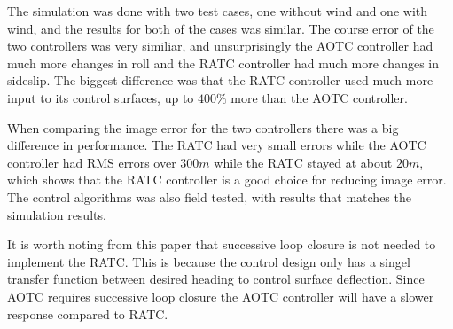 The simulation was done with two test cases, one without wind and one with wind, and the results for both of the cases was similar. The course error of the two controllers was very similiar, and unsurprisingly the AOTC controller had much more changes in roll and the RATC controller had much more changes in sideslip. The biggest difference was that the RATC controller used much more input to its control surfaces, up to $400 \%$ more than the AOTC controller.

When comparing the image error for the two controllers there was a big difference in performance. The RATC had very small errors while the AOTC controller had RMS errors over $300 m$ while the RATC stayed at about $20 m$, which shows that the RATC controller is a good choice for reducing image error. The control algorithms was also field tested, with results that matches the simulation results.

It is worth noting from this paper that successive loop closure is not needed to implement the RATC. This is because the control design only has a singel transfer function between desired heading to control surface deflection. Since AOTC requires successive loop closure the AOTC controller will have a slower response compared to RATC.